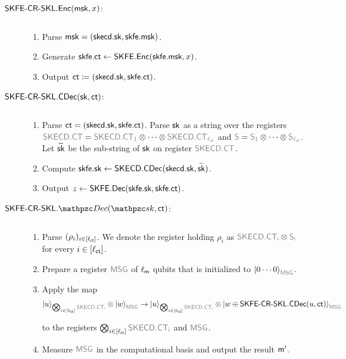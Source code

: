 \begin{description}
\item[$\mathsf{SKFE}\textrm{-}\mathsf{CR}\textrm{-}\mathsf{SKL}.\mathsf{Enc}(\mathsf{msk}, x)$:] $ $
\begin{enumerate}
    \item Parse $\mathsf{msk} = (\mathsf{skecd}.\mathsf{sk}, \mathsf{skfe}.\mathsf{msk})$.
    \item Generate $\mathsf{skfe}.\mathsf{ct}\leftarrow\mathsf{SKFE}.\mathsf{Enc}(\mathsf{skfe}.\mathsf{msk},x)$.
    \item Output $\mathsf{ct}\coloneqq(\mathsf{skecd}.\mathsf{sk}, \mathsf{skfe}.\mathsf{ct})$.
    
\end{enumerate}

\item[$\mathsf{SKFE}\textrm{-}\mathsf{CR}\textrm{-}\mathsf{SKL}.\mathsf{CDec}(\mathsf{sk}, \mathsf{ct})$:] $ $
\begin{enumerate}
\item Parse $\mathsf{ct} = (\mathsf{skecd}.\mathsf{sk}, \mathsf{skfe}.\mathsf{ct})$. Parse $\mathsf{sk}$ as a string over
the registers $\qreg{SKECD.CT} = \qreg{SKECD.CT_1} \otimes \cdots
\otimes \qreg{SKECD.CT_{\ctlen}}$ and $\qreg{S} =
\qreg{S_1} \otimes \cdots \otimes \qreg{S_{\ctlen}}$. Let
$\widetilde{\mathsf{sk}}$ be the sub-string of $\mathsf{sk}$ on register
$\qreg{SKECD.CT}$.
\item Compute $\mathsf{skfe}.\mathsf{sk} \leftarrow \mathsf{SKECD}.\mathsf{CDec}(\mathsf{skecd}.\mathsf{sk}, \widetilde{\mathsf{sk}})$.
\item Output $z\leftarrow\mathsf{SKFE}.\mathsf{Dec}(\mathsf{skfe}.\mathsf{sk},\mathsf{skfe}.\mathsf{ct})$.
\end{enumerate}

\item[$\SKFESKL.\qDec(\qsk, \ct)$:] $ $
\begin{enumerate}
\item Parse $(\rho_i)_{i \in [\ell_{\mathsf{ct}}]}$. We denote the register
holding $\rho_i$ as $\qreg{SKECD.CT_i}\tensor\qreg{S_i}$ for
every $i\in[\ell_{\mathsf{ct}}]$.

\item Prepare a register $\qreg{MSG}$ of $\ell_{\mathsf{m}}$ qubits that is
initialized to $\ket{0\cdots0}_{\qreg{MSG}}$.

\item Apply the map
\begin{align}
\ket{u}_{\bigotimes_{i\in[\ctlen]}\qreg{SKECD.
CT_i}} \tensor\ket{w}_{\qreg{MSG}} \ra
\ket{u}_{\bigotimes_{i\in[\ctlen]}\qreg{SKECD.CT_i}}\tensor\ket{w\oplus
\SKFESKL.\CDec(u, \ct)}_{\qreg{MSG}}
\end{align}

to the registers
$\bigotimes_{i\in[\ctlen]}\qreg{SKECD.CT_i}$ and
$\qreg{MSG}$.
\item Measure $\qreg{MSG}$ in the computational basis and output the result $\mathsf{m}^\prime$.
\end{enumerate}


\end{description}
